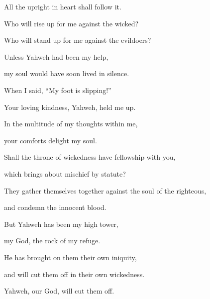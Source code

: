 {\par }{\QB All the upright in heart shall follow it.
\par }{\Q {}Who will rise up for me against the wicked?
\par }{\QB Who will stand up for me against the evildoers?
\par }{\Q {}Unless Yahweh had been my help,
\par }{\QB my soul would have soon lived in silence.
\par }{\Q {}When I said, “My foot is slipping!”
\par }{\QB Your loving kindness, Yahweh, held me up.
\par }{\Q {}In the multitude of my thoughts within me,
\par }{\QB your comforts delight my soul.
\par }{\Q {}Shall the throne of wickedness have fellowship with you,
\par }{\QB which brings about mischief by statute?
\par }{\Q {}They gather themselves together against the soul of the righteous,
\par }{\QB and condemn the innocent blood.
\par }{\Q {}But Yahweh has been my high tower,
\par }{\QB my God, the rock of my refuge.
\par }{\Q {}He has brought on them their own iniquity,
\par }{\QB and will cut them off in their own wickedness.
\par }{\QB Yahweh, our God, will cut them off.

}
